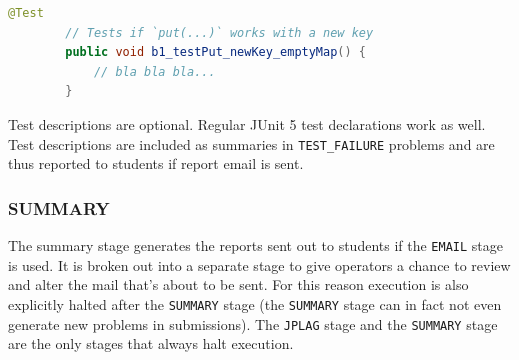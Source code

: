 \documentclass[12pt,a4paper,oneside]{report}
\begin{document}
	\begin{lstlisting}[language=java]
		@Test
		// Tests if `put(...)` works with a new key
		public void b1_testPut_newKey_emptyMap() {
			// bla bla bla...
		}
	\end{lstlisting}

	\pagebreak
	Test descriptions are optional. Regular JUnit 5 test declarations work as well. Test descriptions are included as summaries in \lstinline|TEST_FAILURE| problems and are thus reported to students if report email is sent.

	\subsubsection{SUMMARY}
	The summary stage generates the reports sent out to students if the \lstinline|EMAIL| stage is used. It is broken out into a separate stage to give operators a chance to review and alter the mail that's about to be sent. For this reason execution is also explicitly halted after the \lstinline|SUMMARY| stage (the \lstinline|SUMMARY| stage can in fact not even generate new problems in submissions). The \lstinline|JPLAG| stage and the \lstinline|SUMMARY| stage are the only stages that always halt execution.
\end{document}
